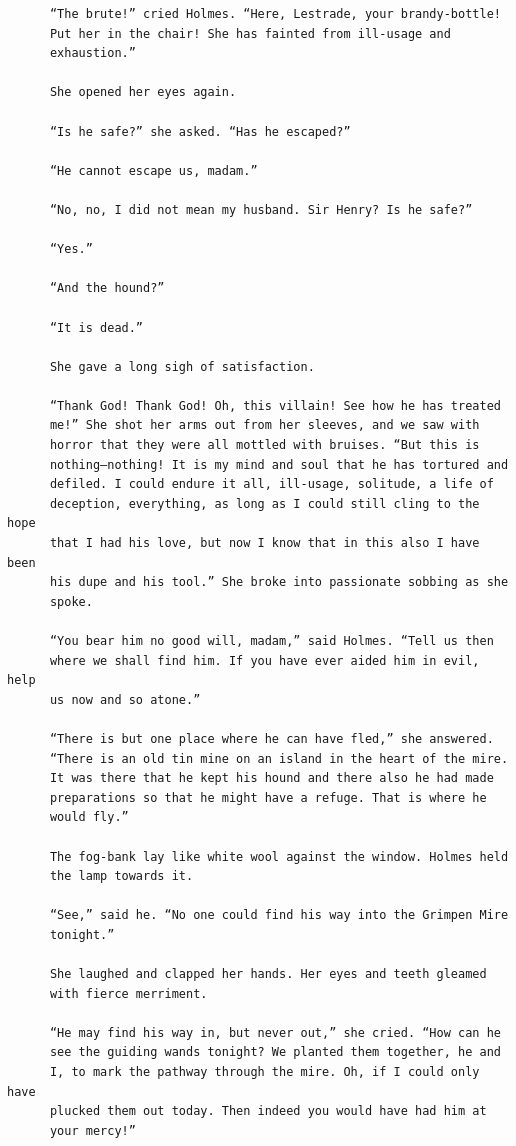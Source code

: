 \documentclass{article}
\begin{document}
\begin{verbatim}
      “The brute!” cried Holmes. “Here, Lestrade, your brandy-bottle!
      Put her in the chair! She has fainted from ill-usage and
      exhaustion.”

      She opened her eyes again.

      “Is he safe?” she asked. “Has he escaped?”

      “He cannot escape us, madam.”

      “No, no, I did not mean my husband. Sir Henry? Is he safe?”

      “Yes.”

      “And the hound?”

      “It is dead.”

      She gave a long sigh of satisfaction.

      “Thank God! Thank God! Oh, this villain! See how he has treated
      me!” She shot her arms out from her sleeves, and we saw with
      horror that they were all mottled with bruises. “But this is
      nothing—nothing! It is my mind and soul that he has tortured and
      defiled. I could endure it all, ill-usage, solitude, a life of
      deception, everything, as long as I could still cling to the hope
      that I had his love, but now I know that in this also I have been
      his dupe and his tool.” She broke into passionate sobbing as she
      spoke.

      “You bear him no good will, madam,” said Holmes. “Tell us then
      where we shall find him. If you have ever aided him in evil, help
      us now and so atone.”

      “There is but one place where he can have fled,” she answered.
      “There is an old tin mine on an island in the heart of the mire.
      It was there that he kept his hound and there also he had made
      preparations so that he might have a refuge. That is where he
      would fly.”

      The fog-bank lay like white wool against the window. Holmes held
      the lamp towards it.

      “See,” said he. “No one could find his way into the Grimpen Mire
      tonight.”

      She laughed and clapped her hands. Her eyes and teeth gleamed
      with fierce merriment.

      “He may find his way in, but never out,” she cried. “How can he
      see the guiding wands tonight? We planted them together, he and
      I, to mark the pathway through the mire. Oh, if I could only have
      plucked them out today. Then indeed you would have had him at
      your mercy!”


\end{verbatim}
\end{document}
